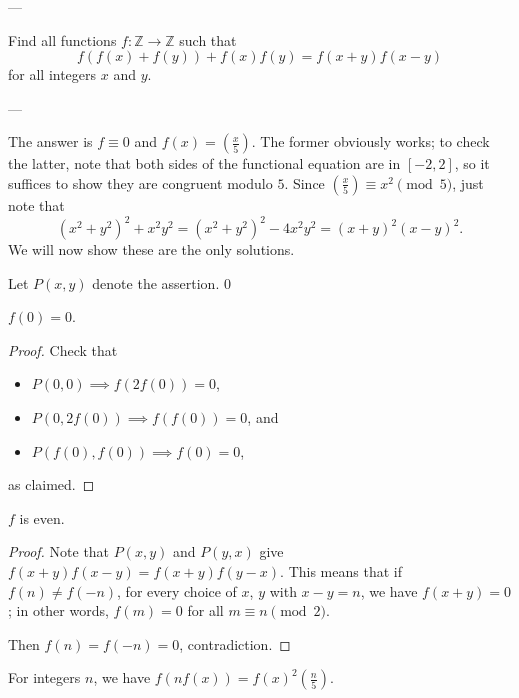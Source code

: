 
---

Find all functions $f:\mathbb Z\to\mathbb Z$ such that \[f(f(x)+f(y))+f(x)f(y)=f(x+y)f(x-y)\]
for all integers $x$ and $y$.

---

The answer is $f\equiv0$ and $f(x)=\left(\frac x5\right)$. The former obviously works; to check the latter, note that both sides of the functional equation are in $[-2,2]$, so it suffices to show they are congruent modulo $5$. Since $\left(\frac x5\right)\equiv x^2\pmod5$, just note that \[\left(x^2+y^2\right)^2+x^2y^2=\left(x^2+y^2\right)^2-4x^2y^2=(x+y)^2(x-y)^2.\]
We will now show these are the only solutions.

Let $P(x,y)$ denote the assertion.
\setcounter{iclaim}0
\begin{iclaim}
    $f(0)=0$.
\end{iclaim}
\begin{proof}
    Check that
    \begin{itemize}[itemsep=0em]
        \item $P(0,0)\implies f(2f(0))=0$,
        \item $P(0,2f(0))\implies f(f(0))=0$, and
        \item $P(f(0),f(0))\implies f(0)=0$,
    \end{itemize}
    as claimed.
\end{proof}
\begin{iclaim}
    $f$ is even.
\end{iclaim}
\begin{proof}
    Note that $P(x,y)$ and $P(y,x)$ give $f(x+y)f(x-y)=f(x+y)f(y-x)$. This means that if $f(n)\ne f(-n)$, for every choice of $x$, $y$ with $x-y=n$, we have $f(x+y)=0$; in other words, $f(m)=0$ for all $m\equiv n\pmod2$.

    Then $f(n)=f(-n)=0$, contradiction.
\end{proof}
\begin{iclaim}
    For integers $n$, we have $f(nf(x))=f(x)^2\left(\frac n5\right)$.
\end{iclaim}
